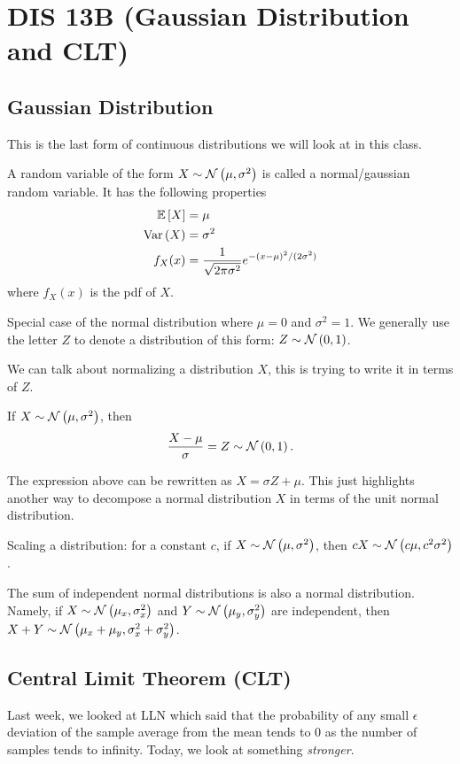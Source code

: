\section{DIS 13B (Gaussian Distribution and CLT)}

\subsection{Gaussian Distribution}

This is the last form of continuous distributions we will look at in this class. 

A random variable of the form $X \sim \mathcal{N}\left( \mu, \sigma^2 \right)$ is called a normal/gaussian random variable. It has the following properties \begin{align*}
    \mathbb{E}\left[ X \right] &= \mu \\
    \text{Var}\left( X \right) &= \sigma^2 \\ 
    f_X(x) &= \frac{1}{\sqrt{2\pi\sigma^2}}e^{-(x-\mu)^2/(2\sigma^2)}
\end{align*}
where $f_X(x)$ is the pdf of $X$. 

\begin{definition}
    Special case of the normal distribution where $\mu = 0$ and $\sigma^2 = 1$. We generally use the letter $Z$ to denote a distribution of this form: $Z \sim \mathcal{N}\left( 0, 1 \right)$. 
\end{definition}

We can talk about normalizing a distribution $X$, this is trying to write it in terms of $Z$.

If $X \sim \mathcal{N}\left( \mu, \sigma^2 \right)$, then \[ \frac{X - \mu}{\sigma} = Z \sim \mathcal{N}\left( 0, 1 \right). \]

The expression above can be rewritten as $X = \sigma Z + \mu$. This just highlights another way to decompose a normal distribution $X$ in terms of the unit normal distribution. 

Scaling a distribution: for a constant $c$, if $X \sim \mathcal{N}\left( \mu, \sigma^2 \right)$, then $cX \sim \mathcal{N}\left( c\mu, c^2\sigma^2 \right)$. 

\begin{theorem}
    The sum of independent normal distributions is also a normal distribution. Namely, if $X \sim \mathcal{N}\left( \mu_x, \sigma^2_x \right)$ and $Y \sim \mathcal{N}\left( \mu_y, \sigma^2_y \right)$ are independent, then $X+Y \sim \mathcal{N}\left( \mu_x+\mu_y, \sigma^2_x+\sigma^2_y \right)$. 
\end{theorem}

\subsection{Central Limit Theorem (CLT)}
Last week, we looked at LLN which said that the probability of any small $\epsilon$ deviation of the sample average from the mean tends to 0 as the number of samples tends to infinity. Today, we look at something \textit{stronger}. 

